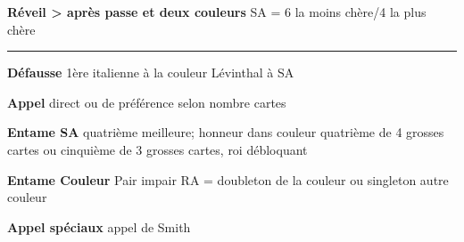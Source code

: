 \documentclass[twoside,a5paper]{article} \listfiles
\newcommand{\g}[1]{\textbf{#1}}
\begin{document}
{\begin{multicols}{2}
	\g{Réveil > après passe et deux couleurs} SA = 6 la moins chère/4	 la plus chère
	 
	  
	 \rule{\linewidth}{1.5pt}
	 
	  \g{Défausse} \newline
	  1ère italienne à la couleur \newline
	  Lévinthal à SA
	  
	  
	  \g{Appel} \newline
	 direct ou de préférence selon nombre cartes
	 
	   						 
	 
	 
	 \g{Entame SA} \newline
	quatrième meilleure; honneur dans couleur quatrième de 4 grosses cartes ou cinquième de 3 grosses cartes, roi débloquant


	\g{Entame Couleur} \newline
	Pair impair\newline
	RA = doubleton de la couleur ou singleton autre couleur


	\g{Appel spéciaux} \newline
	appel de Smith

	
	\end{multicols}
}
\end{document}
